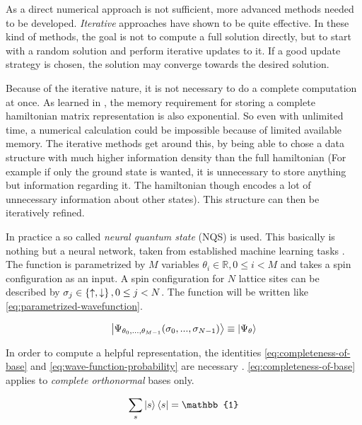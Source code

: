 As a direct numerical approach is not sufficient, more advanced methods needed to be developed. 
\emph{Iterative} approaches have shown to be quite effective. 
In these kind of methods, the goal is not to compute a full solution directly, but to start with a random solution and perform iterative updates to it. 
If a good update strategy is chosen, the solution may converge towards the desired solution.

Because of the iterative nature, it is not necessary to do a complete computation at once. 
As learned in , the memory requirement for storing a complete hamiltonian matrix representation is also exponential.
So even with unlimited time, a numerical calculation could be impossible because of limited available memory. 
The iterative methods get around this, by being able to chose a data structure with much higher information density than the full hamiltonian (For example if only the ground state is wanted, it is unnecessary to store anything but information regarding it. The hamiltonian though encodes a lot of \glqq unnecessary\grqq{} information about other states). This structure can then be iteratively refined.

In practice a so called \emph{neural quantum state} (NQS) is used. 
This basically is nothing but a neural network, taken from established machine learning tasks \cite{restrictedBoltzmanMachines}.
The function is parametrized by $M$ variables $\theta_i \in \mathbb{R}, 0\leq i < M$ and takes a spin configuration as an input.
A spin configuration for $N$ lattice sites can be described by $\sigma_j \in \left\{\uparrow, \downarrow\right\}, 0\leq j < N$.
The function will be written like \autoref{eq:parametrized-wavefunction}.

\begin{equation}
    \label{eq:parametrized-wavefunction}
    \ket{\Psi_{\theta_0, ..., \theta_{M-1}}(\sigma_0, ..., \sigma_{N-1})} \equiv \ket{\Psi_\theta}
\end{equation}

In order to compute a helpful representation, the identities \autoref{eq:completeness-of-base} and \autoref{eq:wave-function-probability} are necessary \cite{schwablQM}. \autoref{eq:completeness-of-base} applies to \emph{complete orthonormal} bases only.

\begin{equation}
    \label{eq:completeness-of-base}
    \sum\limits_{s} \ket{s}\bra{s} = \mathbb{1}
\end{equation}

